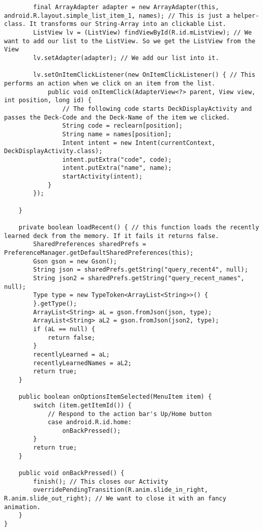\begin{lstlisting}
        final ArrayAdapter adapter = new ArrayAdapter(this, android.R.layout.simple_list_item_1, names); // This is just a helper-class. It transforms our String-Array into an clickable List.
        ListView lv = (ListView) findViewById(R.id.mListView); // We want to add our list to the ListView. So we get the ListView from the View
        lv.setAdapter(adapter); // We add our list into it.

        lv.setOnItemClickListener(new OnItemClickListener() { // This performs an action when we click on an item from the list.
            public void onItemClick(AdapterView<?> parent, View view, int position, long id) {
                // The following code starts DeckDisplayActivity and passes the Deck-Code and the Deck-Name of the item we clicked.
                String code = reclearn[position];
                String name = names[position];
                Intent intent = new Intent(currentContext, DeckDisplayActivity.class);
                intent.putExtra("code", code);
                intent.putExtra("name", name);
                startActivity(intent);
            }
        });

    }

    private boolean loadRecent() { // this function loads the recently learned deck from the memory. If it fails it returns false.
        SharedPreferences sharedPrefs = PreferenceManager.getDefaultSharedPreferences(this);
        Gson gson = new Gson();
        String json = sharedPrefs.getString("query_recent4", null);
        String json2 = sharedPrefs.getString("query_recent_names", null);
        Type type = new TypeToken<ArrayList<String>>() {
        }.getType();
        ArrayList<String> aL = gson.fromJson(json, type);
        ArrayList<String> aL2 = gson.fromJson(json2, type);
        if (aL == null) {
            return false;
        }
        recentlyLearned = aL;
        recentlyLearnedNames = aL2;
        return true;
    }

    public boolean onOptionsItemSelected(MenuItem item) {
        switch (item.getItemId()) {
            // Respond to the action bar's Up/Home button
            case android.R.id.home:
                onBackPressed();
        }
        return true;
    }

    public void onBackPressed() {
        finish(); // This closes our Activity
        overridePendingTransition(R.anim.slide_in_right, R.anim.slide_out_right); // We want to close it with an fancy animation.
    }
}
\end{lstlisting}
\newpage
